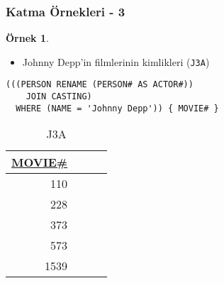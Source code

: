 \documentclass[dvipsnames]{beamer}
\theoremstyle{definition}
\theoremstyle{example}
\newtheorem{ornek}[theorem]{Örnek}
\theoremstyle{plain}
\begin{document}
\begin{frame}[fragile]
  \frametitle{Katma Örnekleri - 3}

  \begin{ornek}
    \begin{itemize}
      \item Johnny Depp'in filmlerinin kimlikleri (\texttt{J3A})
    \end{itemize}

    \begin{lstlisting}
(((PERSON RENAME (PERSON# AS ACTOR#))
    JOIN CASTING)
  WHERE (NAME = 'Johnny Depp')) { MOVIE# }
  \end{lstlisting}

    \pause
    \vspace{-10pt}
    \begin{tiny}
    \begin{table}
      \caption{J3A}
      \begin{tabular}{|r|l|r|r|}\hline
\underline{MOVIE\#}\\[2pt]\hline\hline
                110\\\hline
                228\\\hline
                373\\\hline
                573\\\hline
               1539\\\hline
      \end{tabular}
    \end{table}
    \end{tiny}
  \end{ornek}
\end{frame}
\end{document}
